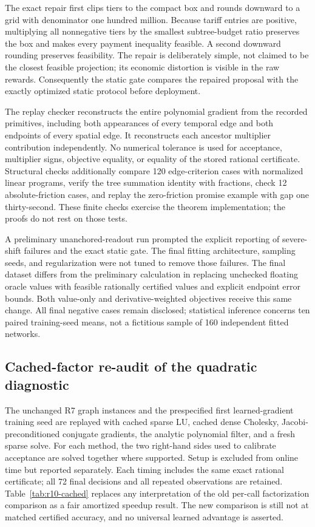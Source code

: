 The exact repair first clips tiers to the compact box and rounds downward to a grid with denominator one hundred million. Because tariff entries are positive, multiplying all nonnegative tiers by the smallest subtree-budget ratio preserves the box and makes every payment inequality feasible. A second downward rounding preserves feasibility. The repair is deliberately simple, not claimed to be the closest feasible projection; its economic distortion is visible in the raw rewards. Consequently the static gate compares the repaired proposal with the exactly optimized static protocol before deployment.

The replay checker reconstructs the entire polynomial gradient from the recorded primitives, including both appearances of every temporal edge and both endpoints of every spatial edge. It reconstructs each ancestor multiplier contribution independently. No numerical tolerance is used for acceptance, multiplier signs, objective equality, or equality of the stored rational certificate. Structural checks additionally compare 120 edge-criterion cases with normalized linear programs, verify the tree summation identity with fractions, check 12 absolute-friction cases, and replay the zero-friction promise example with gap one thirty-second. These finite checks exercise the theorem implementation; the proofs do not rest on those tests.

A preliminary unanchored-readout run prompted the explicit reporting of severe-shift failures and the exact static gate. The final fitting architecture, sampling seeds, and regularization were not tuned to remove those failures. The final dataset differs from the preliminary calculation in replacing unchecked floating oracle values with feasible rationally certified values and explicit endpoint error bounds. Both value-only and derivative-weighted objectives receive this same change. All final negative cases remain disclosed; statistical inference concerns ten paired training-seed means, not a fictitious sample of 160 independent fitted networks.

\subsection{Cached-factor re-audit of the quadratic diagnostic}
The unchanged R7 graph instances and the prespecified first learned-gradient training seed are replayed with cached sparse LU, cached dense Cholesky, Jacobi-preconditioned conjugate gradients, the analytic polynomial filter, and a fresh sparse solve. For each method, the two right-hand sides used to calibrate acceptance are solved together where supported. Setup is excluded from online time but reported separately. Each timing includes the same exact rational certificate; all 72 final decisions and all repeated observations are retained. Table~\ref{tab:r10-cached} replaces any interpretation of the old per-call factorization comparison as a fair amortized speedup result. The new comparison is still not at matched certified accuracy, and no universal learned advantage is asserted.


